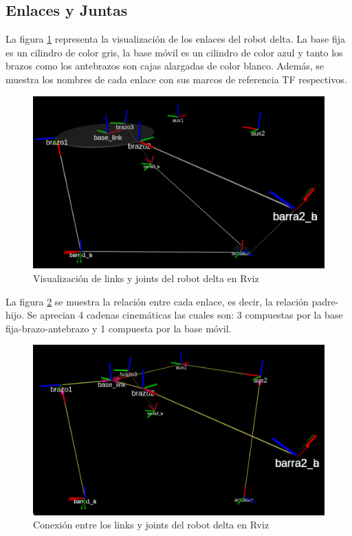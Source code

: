 \newpage

    \subsection{Enlaces y Juntas}\label{enalcesyjuntas_cap7}
        La figura \ref{f:cap7_rviz_2} representa la visualización de los enlaces del robot delta. La base fija es un cilindro de color gris, la base móvil es un cilindro de color azul y tanto los brazos como los antebrazos son cajas alargadas de color blanco. Además, se muestra los nombres de cada enlace con sus marcos de referencia TF respectivos.
        \begin{figure}[h]
            \centering
            \includegraphics[width=0.8\linewidth]{Main/Chapter7/Images7/rviz_2.png}
            \caption{Visualización de links y joints del robot delta en Rviz}
            \label{f:cap7_rviz_2}
        \end{figure}  
        
    La figura \ref{f:cap7_rviz_3} se muestra la relación entre cada enlace, es decir, la relación padre-hijo. Se aprecian 4 cadenas cinemáticas las cuales son: 3 compuestas por la base fija-brazo-antebrazo y 1 compuesta por la base móvil.    
    \begin{figure}[h]
            \centering
            \includegraphics[width=0.8\linewidth]{Main/Chapter7/Images7/rviz_3.png}
            \caption{Conexión entre los links y joints del robot delta en Rviz}
            \label{f:cap7_rviz_3}
        \end{figure}  

